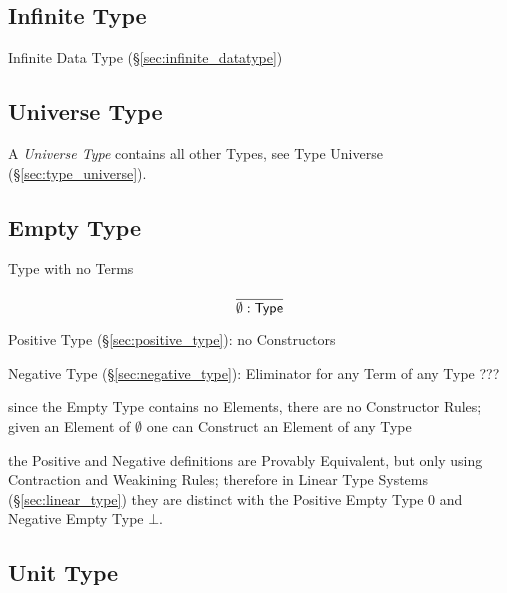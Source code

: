 \subsection{Infinite Type}\label{sec:infinite_type}

Infinite Data Type (\S\ref{sec:infinite_datatype})



\subsection{Universe Type}\label{sec:universe_type}

A \emph{Universe Type} contains all other Types, see Type Universe
(\S\ref{sec:type_universe}).



\subsection{Empty Type}\label{sec:empty_type}

Type with no Terms

\[
  \frac{}
  {\emptyset:\mathsf{Type}}
\]


Positive Type (\S\ref{sec:positive_type}): no Constructors

Negative Type (\S\ref{sec:negative_type}): Eliminator for any Term of
any Type ???

since the Empty Type contains no Elements, there are no Constructor
Rules; given an Element of $\emptyset$ one can Construct an Element of
any Type

the Positive and Negative definitions are Provably Equivalent, but
only using Contraction and Weakining Rules; therefore in Linear Type
Systems (\S\ref{sec:linear_type}) they are distinct with the Positive
Empty Type $0$ and Negative Empty Type $\bot$.



\subsection{Unit Type}\label{sec:unit_type}


